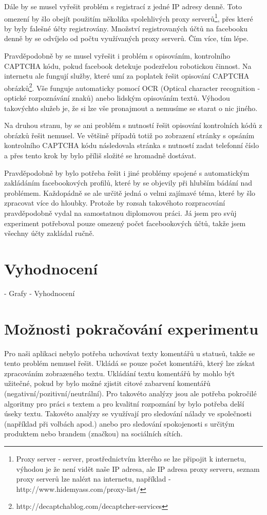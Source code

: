 \documentclass[thesis=M,czech]{FITthesis}[2013/05/10]
\begin{document}
Dále by se musel vyřešit problém s registrací z jedné IP adresy denně. Toto omezení by šlo obejít použitím několika spolehlivých proxy serverů\footnote{Proxy server - server, prostřednictvím kterého se lze připojit k internetu, výhodou je že není vidět naše IP adresa, ale IP adresa proxy serveru, seznam proxy serverů lze nalézt na internetu, například - http://www.hidemyass.com/proxy-list/}, přes které by byly falešné účty registrovány. Množství registrovaných účtů na facebooku denně by se odvíjelo od počtu využívaných proxy serverů. Čím více, tím lépe.

Pravděpodobně by se musel vyřešit i problém s opisováním, kontrolního CAPTCHA kódu, pokud facebook detekuje podezřelou robotickou činnost. Na internetu ale fungují služby, které umí za poplatek řešit opisování CAPTCHA obrázků\footnote{http://decaptchablog.com/decaptcher-services}. Vše funguje automaticky pomocí OCR (Optical character recognition - optické rozpoznávání znaků) anebo lidským opisováním textů. Výhodou takovýchto služeb je, že si lze vše pronajmout a nemusíme se starat o nic jiného. 

Na druhou stranu, by se ani problém s nutností řešit opisování kontrolních kódů z obrázků řešit nemusel. Ve většině případů totiž po zobrazení stránky s opsáním kontrolního CAPTCHA kódu následovala stránka s nutností zadat telefonní číslo a přes tento krok by bylo příliš složité se hromadně dostávat.

Pravděpodobně by bylo potřeba řešit i jiné problémy spojené s automatickým zakládáním facebookových profilů, které by se objevily při hlubším bádání nad problémem. Každopádně se ale určitě jedná o velmi zajímavé téma, které by šlo zpracovat více do hloubky. Protože by rozsah takovéhoto rozpracování pravděpodobně vydal na samostatnou diplomovou práci. Já jsem pro svůj experiment potřeboval pouze omezený počet facebookových účtů, takže jsem všechny účty zakládal ručně.

\section{Vyhodnocení}
- Grafy
- Vyhodnocení


\section{Možnosti pokračování experimentu}

Pro naši aplikaci nebylo potřeba uchovávat texty komentářů u statusů, takže se tento problém nemusel řešit. Ukládá se pouze počet komentářů, který lze získat zpracováním zobrazeného textu. Ukládání textu komentářů by mohlo být užitečné, pokud by bylo možné zjistit citové zabarvení komentářů (negativní/pozitivní/neutrální). Pro takovéto analýzy jsou ale potřeba pokročilé algoritmy pro práci s textem a pro kvalitní rozpoznání by bylo potřeba delší úseky textu. Takovéto analýzy se využívají pro sledování nálady ve společnosti (například při volbách apod.) anebo pro sledování spokojenosti s určitým produktem nebo brandem (značkou) na sociálních sítích. 
\end{document}
